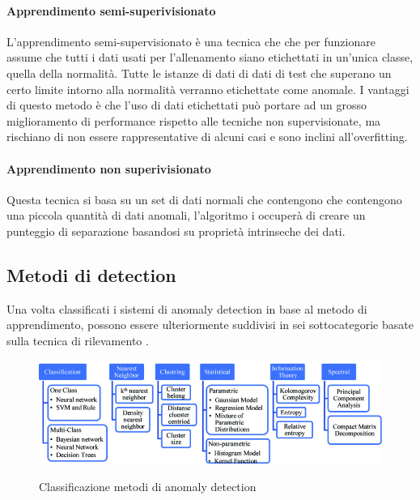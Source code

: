 \paragraph{Apprendimento semi-superivisionato}

L'apprendimento semi-supervisionato è una tecnica che che per funzionare assume che tutti i dati usati per l'allenamento siano etichettati in un'unica classe, quella della normalità. Tutte le istanze di dati di dati di test che superano un certo limite intorno alla normalità verranno etichettate come anomale. I vantaggi di questo metodo è che l'uso di dati etichettati può portare ad un grosso miglioramento di performance rispetto alle tecniche non supervisionate, ma rischiano di non essere rappresentative di alcuni casi e sono inclini all'overfitting.

\paragraph{Apprendimento non superivisionato}

Questa tecnica si basa su un set di dati normali che contengono che contengono una piccola quantità di dati anomali, l'algoritmo i occuperà di creare un punteggio di separazione basandosi su proprietà intrinseche dei dati.


\subsection{Metodi di detection}

Una volta classificati i sistemi di anomaly detection in base al metodo di apprendimento, possono essere ulteriormente suddivisi in sei sottocategorie basate sulla tecnica di rilevamento \cite{anomaly_detection_techniques, anomaly_detection_classification}.


\begin{figure}[]
    \begin{center}
        
    \label{fig:anomaly_classification}
    \includegraphics[width=\hsize]{images/reti_neurali/classification.jpg}
    \caption{Classificazione metodi di anomaly detection}
    \centering
    \end{center}
\end{figure}

